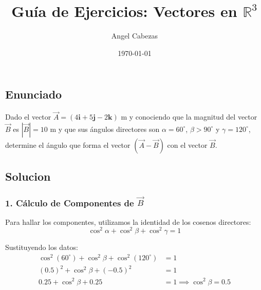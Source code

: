 \documentclass[12pt, a4paper]{article}
\title{Guía de Ejercicios: Vectores en $\mathbb{R}^3$}
\author{Angel Cabezas}
\date{\today}
\begin{document}
\subsection*{Enunciado}
Dado el vector $\vec{A} = (4\mathbf{i} + 5\mathbf{j} - 2\mathbf{k}) \text{ m}$ y conociendo que la magnitud del vector $\vec{B}$ es $|\vec{B}| = 10 \text{ m}$ y que sus ángulos directores son $\alpha = 60^\circ$, $\beta > 90^\circ$ y $\gamma = 120^\circ$, determine el ángulo que forma el vector $(\vec{A} - \vec{B})$ con el vector $\vec{B}$.

\begin{center}
\end{center}

\hr

\subsection*{Solucion}

\subsubsection*{1. Cálculo de Componentes de $\vec{B}$}
Para hallar los componentes, utilizamos la identidad de los cosenos directores:
\begin{equation}
    \cos^2 \alpha + \cos^2 \beta + \cos^2 \gamma = 1
\end{equation}

Sustituyendo los datos:
\begin{align*}
    \cos^2(60^\circ) + \cos^2 \beta + \cos^2(120^\circ) &= 1 \\
    (0.5)^2 + \cos^2 \beta + (-0.5)^2 &= 1 \\
    0.25 + \cos^2 \beta + 0.25 &= 1 \implies \cos^2 \beta = 0.5
\end{align*}
\end{document}
